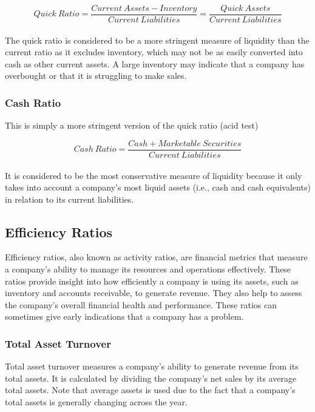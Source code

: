 \documentclass{article}
\begin{document}
 \begin{equation}
    Quick\: Ratio = \frac{Current\: Assets - Inventory}{Current\: Liabilities} = \frac{Quick\: Assets}{Current\: Liabilities}
\end{equation}\\

The quick ratio is considered to be a more stringent measure of liquidity than the current ratio as it excludes inventory, which may not be as easily converted into cash as other current assets. A large inventory may indicate that a company has overbought or that it is struggling to make sales. 

\subsubsection{Cash Ratio}
This is simply a more stringent version of the quick ratio (acid test)

\begin{equation}
    Cash\: Ratio = \frac{Cash + Marketable\: Securities}{Current\: Liabilities} 
\end{equation}\\

It is considered to be the most conservative measure of liquidity because it only takes into account a company's most liquid assets (i.e., cash and cash equivalents) in relation to its current liabilities.

\subsection{Efficiency Ratios}
Efficiency ratios, also known as activity ratios, are financial metrics that measure a company's ability to manage its resources and operations effectively. These ratios provide insight into how efficiently a company is using its assets, such as inventory and accounts receivable, to generate revenue. They also help to assess the company's overall financial health and performance. These ratios can sometimes give early indications that a company has a problem.

\subsubsection{Total Asset Turnover}
Total asset turnover measures a company's ability to generate revenue from its total assets. It is calculated by dividing the company's net sales by its average total assets. Note that average assets is used due to the fact that a company's total assets is generally changing across the year. 
\end{document}
